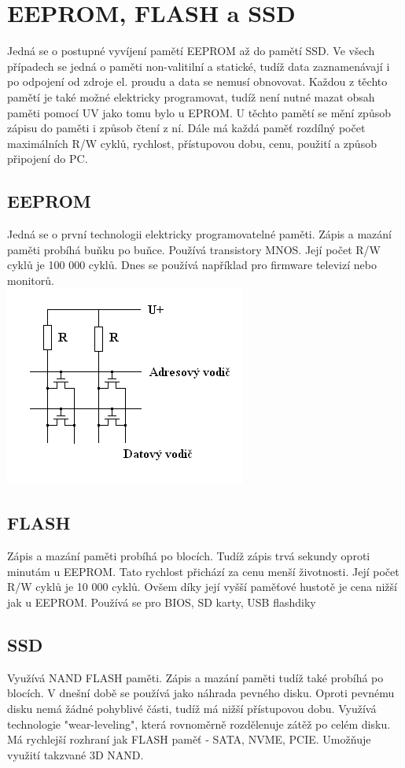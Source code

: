 \section{EEPROM, FLASH a SSD}
\label{sec:eeprom-flash-ssd}
Jedná se o postupné vyvíjení pamětí EEPROM až do pamětí SSD.
Ve všech případech se jedná o paměti non-valitilní a statické, tudíž data zaznamenávají i po odpojení od zdroje el. proudu a data se nemusí obnovovat.
Každou z těchto pamětí je také možné elektricky programovat, tudíž není nutné mazat obsah paměti pomocí UV jako tomu bylo u EPROM.
U těchto pamětí se mění způsob zápisu do paměti i způsob čtení z ní.
Dále má každá paměť rozdílný počet maximálních R/W cyklů, rychlost, přístupovou dobu, cenu, použití a způsob připojení do PC.
\subsection{EEPROM}
\begin{vwcol}[widths={0.6, 0.4}]
  Jedná se o první technologii elektricky programovatelné paměti.
  Zápis a mazání paměti probíhá buňku po buňce.
  Používá transistory MNOS.
  Její počet R/W cyklů je 100 000 cyklů.
  Dnes se používá například pro firmware televizí nebo monitorů.\\
  \vspace*{-1.5cm}\includegraphics[width=0.3\linewidth]{TVY-POS/EEPROM-FLASH-SSD/EEPROM.png}
\end{vwcol}
\subsection{FLASH}
Zápis a mazání paměti probíhá po blocích.
Tudíž zápis trvá sekundy oproti minutám u EEPROM.
Tato rychlost přichází za cenu menší životnosti.
Její počet R/W cyklů je 10 000 cyklů.
Ovšem díky její vyšší paměťové hustotě je cena nižší jak u EEPROM.
Používá se pro BIOS, SD karty, USB flashdiky
\subsection{SSD}
Využívá NAND FLASH paměti.
Zápis a mazání paměti tudíž také probíhá po blocích.
V dnešní době se používá jako náhrada pevného disku.
Oproti pevnému disku nemá žádné pohyblivé části, tudíž má nižší přístupovou dobu.
Využívá technologie "wear-leveling", která rovnoměrně rozdělenuje zátěž po celém disku.
Má rychlejší rozhraní jak FLASH paměť - SATA, NVME, PCIE.
Umožňuje využití takzvané 3D NAND.
